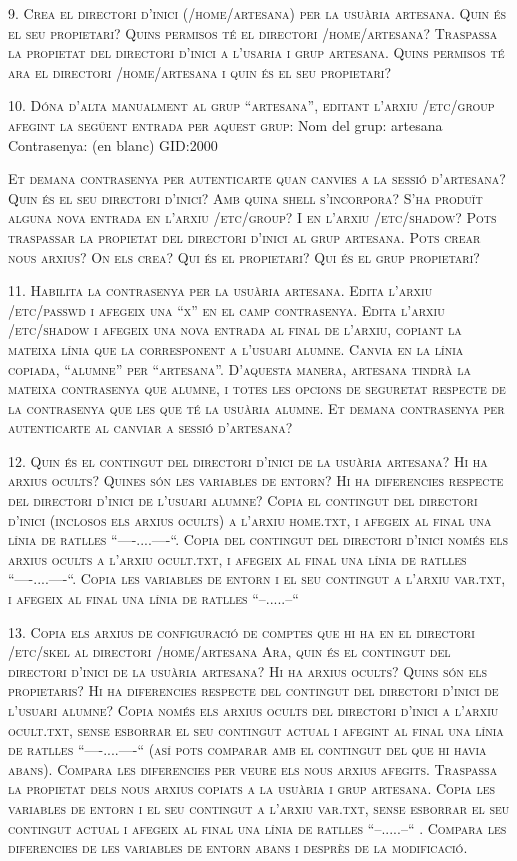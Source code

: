 \documentclass[a4paper,12pt]{article}
\begin{document}
\textsc{9. Crea el directori d’inici (/home/artesana) per la usuària artesana. Quin és el seu propietari? Quins permisos té el directori  /home/artesana? Traspassa la propietat del directori d’inici a l’usaria i grup artesana. Quins permisos té ara el directori /home/artesana i quin és el seu propietari?}

\textsc{10.  Dóna d’alta manualment al grup “artesana”, editant  l’arxiu /etc/group afegint la següent entrada per aquest grup:}
Nom del grup: artesana
Contrasenya: (en blanc)
GID:2000

\textsc{Et demana contrasenya per autenticarte quan canvies a la sessió d’artesana? Quin és el seu directori d’inici? Amb quina shell s’incorpora? S’ha produït alguna nova entrada en l’arxiu /etc/group? I en l’arxiu  /etc/shadow? Pots traspassar la propietat del directori d’inici al grup artesana. Pots crear nous arxius? On els crea? Qui és el propietari? Qui és el grup propietari?}

\textsc{11.  Habilita la contrasenya per la usuària artesana. Edita l’arxiu /etc/passwd i afegeix una “x” en el camp contrasenya. Edita  l’arxiu /etc/shadow i afegeix una nova entrada al final de l’arxiu, copiant la mateixa línia que la corresponent a l’usuari alumne. Canvia  en la línia copiada, “alumne” per “artesana”. D’aquesta manera, artesana tindrà la mateixa contrasenya que alumne, i totes les opcions de seguretat respecte de la contrasenya que les que té la usuària alumne. Et demana contrasenya per autenticarte al canviar a sessió d’artesana?}

\textsc{12.  Quin és el contingut del directori d’inici de la usuària artesana? Hi ha arxius ocults? Quines són les variables de entorn? Hi ha diferencies respecte del directori d’inici de l’usuari alumne? Copia el contingut del directori d’inici (inclosos els arxius ocults) a l’arxiu home.txt, i afegeix al final una línia de ratlles “----....----“. Copia del contingut del directori d’inici només els arxius ocults a l’arxiu ocult.txt, i afegeix al final una línia de ratlles “----....----“. Copia les variables de entorn i el seu contingut a l’arxiu var.txt,  i afegeix al final una línia de ratlles “--.....--“}

\textsc{13. Copia els arxius de configuració de comptes que hi ha en el directori /etc/skel al directori /home/artesana Ara, quin és el contingut del directori d’inici de la usuària artesana? Hi ha arxius ocults? Quins són els propietaris? Hi ha diferencies respecte del contingut del directori d’inici de l’usuari alumne? Copia només els arxius ocults del directori d’inici a l’arxiu ocult.txt, sense esborrar el seu contingut actual i afegint al final una línia de ratlles “----....----“ (así pots comparar amb el contingut del que hi havia abans). Compara les diferencies per veure els nous arxius afegits. Traspassa la propietat dels nous arxius copiats a la usuària i grup artesana. Copia les variables de entorn i el seu contingut a l’arxiu var.txt, sense esborrar el seu contingut actual i afegeix al final una línia de ratlles “--.....--“ . Compara les diferencies de les variables de entorn abans i desprès de la modificació.}
\end{document}
